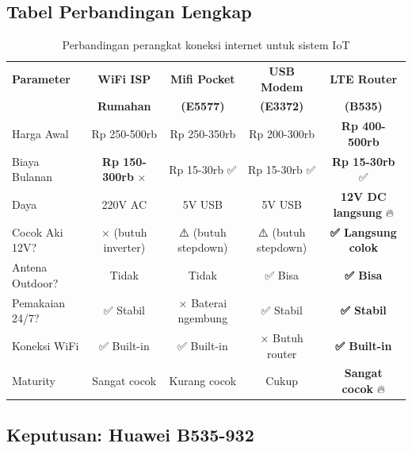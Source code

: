 \documentclass[12pt,a4paper,oneside]{report}
\begin{document}
\subsection{Tabel Perbandingan Lengkap}

\begin{table}[H]
\centering
\caption{Perbandingan perangkat koneksi internet untuk sistem IoT}
\label{tab:internet-compare}
\begin{tabularx}{\textwidth}{X c c c c}
\toprule
\textbf{Parameter} & \textbf{WiFi ISP} & \textbf{Mifi Pocket} & \textbf{USB Modem} & \textbf{LTE Router} \\
 & \textbf{Rumahan} & \textbf{(E5577)} & \textbf{(E3372)} & \textbf{(B535)} \\
\midrule
Harga Awal & Rp 250-500rb & Rp 250-350rb & Rp 200-300rb & \textbf{Rp 400-500rb} \\
Biaya Bulanan & \textbf{Rp 150-300rb} × & Rp 15-30rb ✅ & Rp 15-30rb ✅ & \textbf{Rp 15-30rb} ✅ \\
Daya & 220V AC & 5V USB & 5V USB & \textbf{12V DC langsung} 🔥 \\
Cocok Aki 12V? & × (butuh inverter) & ⚠️ (butuh stepdown) & ⚠️ (butuh stepdown) & \textbf{✅ Langsung colok} \\
Antena Outdoor? & Tidak & Tidak & ✅ Bisa & \textbf{✅ Bisa} \\
Pemakaian 24/7? & ✅ Stabil & × Baterai ngembung & ✅ Stabil & \textbf{✅ Stabil} \\
Koneksi WiFi & ✅ Built-in & ✅ Built-in & × Butuh router & \textbf{✅ Built-in} \\
Maturity & Sangat cocok & Kurang cocok & Cukup & \textbf{Sangat cocok} 🔥 \\
\bottomrule
\end{tabularx}
\end{table}

\subsection{Keputusan: Huawei B535-932}
\end{document}
